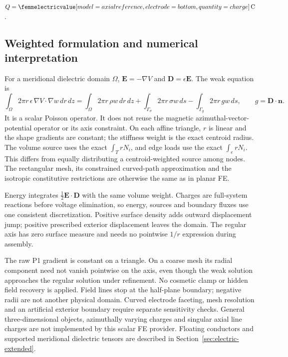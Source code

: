 \begin{codeexample}[width=0pt]
\begin{tikzpicture}
\begin{axis}[width=7cm,height=4cm,no markers,
    xlabel={$z$ (cm)},ylabel={$E_z$ (V/m)},ymin=900,ymax=1100]
  \femmelectricplot[profile=axial reference profile,component=Ez,abscissa=z]
\end{axis}
\end{tikzpicture}
\quad
$Q=\femmelectricvalue[model=axial reference,electrode=bottom,quantity=charge]
  \,\mathrm C$.
\end{codeexample}

\subsection{Weighted formulation and numerical interpretation}
For a meridional dielectric domain $\Omega$, $\mathbf E=-\nabla V$ and
$\mathbf D=\epsilon\mathbf E$. The weak equation is
\[
 \int_\Omega 2\pi r\,\epsilon\,\nabla V\cdot\nabla w\,dr\,dz
 =\int_\Omega 2\pi r\,\rho w\,dr\,dz
 +\int_{\Gamma_\sigma}2\pi r\,\sigma w\,ds
 -\int_{\Gamma_g}2\pi r\,g w\,ds,
 \qquad g=\mathbf D\cdot\mathbf n.
\]
It is a scalar Poisson operator. It does not reuse the magnetic
azimuthal-vector-potential operator or its axis constraint.
On each affine triangle, $r$ is linear and the shape gradients are constant;
the stiffness weight is the exact centroid radius. The volume source uses
the exact $\int_T rN_i$, and edge loads use the exact $\int_e rN_i$.
This differs from equally distributing a centroid-weighted source among nodes.
The rectangular mesh, its constrained curved-path approximation and the
isotropic constitutive restrictions are otherwise the same as in planar FE.

Energy integrates $\tfrac12\mathbf E\cdot\mathbf D$ with the same volume
weight. Charges are full-system reactions before voltage elimination, so
energy, sources and boundary fluxes use one consistent discretization.
Positive surface density adds outward displacement jump; positive prescribed
exterior displacement leaves the domain. The regular axis has zero surface
measure and needs no pointwise $1/r$ expression during assembly.

The raw P1 gradient is constant on a triangle. On a coarse mesh its radial
component need not vanish pointwise on the axis, even though the weak solution
approaches the regular solution under refinement. No cosmetic clamp or hidden
field recovery is applied. Field lines stop at the half-plane boundary;
negative radii are not another physical domain. Curved electrode faceting,
mesh resolution and an artificial exterior boundary require separate
sensitivity checks. General three-dimensional objects, azimuthally varying
charges and singular axial line charges are not implemented by this scalar
FE provider. Floating conductors and supported meridional dielectric tensors
are described in Section~\ref{sec:electric-extended}.
